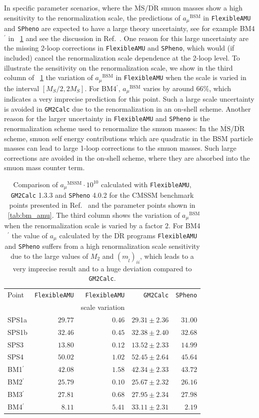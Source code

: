 \documentclass[final,3p,11pt,pdflatex]{elsarticle}
\makeatletter
\newcommand{\spheno}{\texttt{SPheno}\@\xspace}
\newcommand{\GMTCalc}{\texttt{GM2Calc}\@\xspace}
\newcommand{\famu}{\texttt{FlexibleAMU}\@\xspace}
\newcommand{\ol}[1]{\overline{#1}}
\newcommand{\MSbar}{\ensuremath{\ol{\text{MS}}}\xspace}
\newcommand{\DRbar}{\ensuremath{\ol{\text{DR}}}\xspace}
\newcommand{\BSM}{\ensuremath{\text{BSM}}\xspace}
\newcommand{\MSSM}{\ensuremath{\text{MSSM}}\xspace}
\newcommand{\MS}{\ensuremath{M_S}\xspace}
\newcommand{\amu}{\ensuremath{a_\mu}\xspace}
\newcommand{\amuBSM}{\ensuremath{\amu^{\BSM}}\xspace}
\newcommand{\amuMSSM}{\ensuremath{\amu^{\MSSM}}\xspace}
\newcommand{\tabref}[1]{\tablename~\ref{#1}}
\makeatother
\begin{document}
In specific parameter scenarios, where the \MSbar/\DRbar smuon masses
show a high sensitivity to the renormalization scale, the predictions
of $\amuBSM$ in \famu and \spheno are expected to have a large theory
uncertainty, see for example BM4$^\prime$ in \tabref{tab:test_famu}
and see the discussion in Ref.~\cite{Athron:2015rva}.  One
reason for this large uncertainty are the missing 2-loop corrections
in \famu and \spheno, which would (if included) cancel the
renormalization scale dependence at the 2-loop level.  To illustrate
the sensitivity on the renormalization scale, we show in the third
column of \tabref{tab:test_famu} the variation of $\amuBSM$ in \famu
when the scale is varied in the interval $[\MS/2,2\MS]$.  For BM4$^\prime$,
$\amuBSM$ varies by around $66\%$, which indicates a very imprecise
prediction for this point.  Such a large scale uncertainty is avoided
in \GMTCalc due to the renormalization in an on-shell scheme.  Another
reason for the larger uncertainty in \famu and \spheno is the
renormalization scheme used to renormalize the smuon masses: In the
\MSbar/\DRbar scheme, smuon self energy contributions which are
quadratic in the BSM particle masses can lead to large 1-loop
corrections to the smuon masses.  Such large corrections are avoided in
the on-shell scheme, where they are absorbed into the smuon mass
counter term.
%
\begin{table}[tbh]
  \centering
  \begin{tabular}{lrrrr}
    \toprule
    Point & \famu & \famu           & \GMTCalc & \spheno \\
          &       & scale variation &          &         \\
    \midrule
    SPS1a  & $29.77$ & $0.46$ & $29.31 \pm 2.36$ & $31.00$ \\
    SPS1b  & $32.46$ & $0.45$ & $32.38 \pm 2.40$ & $32.68$ \\
    SPS3   & $13.80$ & $0.12$ & $13.52 \pm 2.33$ & $14.99$ \\
    SPS4   & $50.02$ & $1.02$ & $52.45 \pm 2.64$ & $45.64$ \\
    BM1$^\prime$  & $42.08$ & $1.58$ & $42.34 \pm 2.33$ & $43.72$ \\
    BM2$^\prime$  & $25.79$ & $0.10$ & $25.67 \pm 2.32$ & $26.16$ \\
    BM3$^\prime$  & $27.81$ & $0.68$ & $27.95 \pm 2.34$ & $27.98$ \\
    BM4$^\prime$  &  $8.11$ & $5.41$ & $33.11 \pm 2.31$ &  $2.19$ \\
    \bottomrule
  \end{tabular}
  \caption{Comparison of $\amuMSSM\cdot 10^{10}$ calculated with \famu,
    \GMTCalc 1.3.3 and \spheno 4.0.2 for the CMSSM benchmark points
    presented in Ref.~\cite{Allanach:2002nj} and the parameter points shown
    in \tabref{tab:bm_amu}.  The third column shows the variation
    of $\amuBSM$ when the renormalization scale is varied by a factor $2$.
    For BM4$^\prime$ the value of \amu calculated by the \DRbar
    programs \famu and \spheno suffers from a high renormalization scale
    sensitivity due to the large values of $M_2$ and $(m_{\tilde{l}})_{ii}$,
    which leads to a very imprecise result and to a huge deviation
    compared to \GMTCalc.}
  \label{tab:test_famu}
\end{table}
\end{document}
